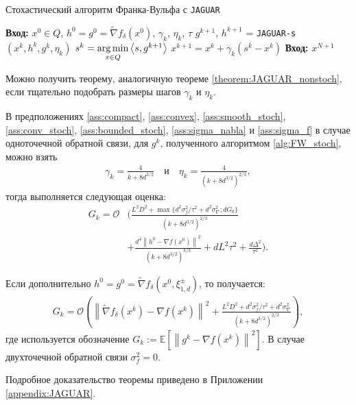     \begin{algorithm}[H]
        \caption{Стохастический алгоритм Франка-Вульфа с \texttt{JAGUAR}} \label{alg:FW_stoch}
        \begin{algorithmic}[1]
        	\State \textbf{Вход:} $x^0 \in Q$, $h^0 = g^0 = \widetilde{\nabla} f_\delta (x^0)$, $\gamma_k$, $\eta_k$, $\tau$
                \State $g^{k + 1}$, $h^{k + 1}$ = \texttt{JAGUAR-s} $\left( x^k, h^k, g^k, \eta_k \right)$
                \State $s^k = \operatorname*{arg\,min}\limits_{x \in Q} \left< s, g^{k + 1} \right>$
                \State $x^{k + 1} = x^k + \gamma_k (s^k - x^k)$
            \EndFor
            \State \textbf{Вход:} $x^{N + 1}$
        \end{algorithmic}
    \end{algorithm}

    Можно получить теорему, аналогичную теореме \ref{theorem:JAGUAR_nonstoch}, если тщательно подобрать размеры шагов $\gamma_k$ и $\eta_k$. 
    
    \begin{theorem} \label{theorem:JAGUAR}
    
        В предположениях \ref{ass:compact}, \ref{ass:convex}, \ref{ass:smooth_stoch}, \ref{ass:conv_stoch}, \ref{ass:bounded_stoch}, \ref{ass:sigma_nabla} и \ref{ass:sigma_f} в случае одноточечной обратной связи, для $g^k$, полученного алгоритмом \ref{alg:FW_stoch}, можно взять
        \begin{align*}
            \gamma_k = \frac{4}{k + 8d^{3/2}} \quad \text{и} \quad \eta_k = \frac{4}{(k + 8d^{3/2})^{2/3}},
        \end{align*}
        тогда выполняется следующая оценка:
        \begin{align*}
            G_k = \mathcal{O}
            &\Bigg(
            \frac{L^2 D^2 + \max \{ d^2 \sigma_f^2 / \tau^2 + d^2 \sigma_\nabla^2; d G_0\}}{(k + 8d^{3 / 2})^{2 / 3}}\\
            &+
            \frac{d^4 \left\| h^0 - \nabla f(x^0) \right\|^2}{(k + 8d^{3 / 2})^{8 / 3}} + d L^2 \tau^2 + \frac{d \Delta^2}{\tau^2} \Bigg).
        \end{align*}

        \noindent Если дополнительно $h^0 = g^0 = \widetilde{\nabla} f_\delta (x^0, \xi_{\overline{1, d}}^\pm)$, то получается:
        \begin{align*}
            G_k = \mathcal{O} \left( \left\| \widetilde{\nabla} f_\delta (x^k) - \nabla f(x^k) \right\|^2 + \frac{L^2 D^2 + d^2 \sigma_f^2 / \tau^2 + d^2 \sigma_\nabla^2}{(k + 8d^{3 / 2})^{2 / 3}} \right),
        \end{align*}
        где используется обозначение $G_k := \mathbb{E} \left[ \left\| g^k - \nabla f(x^k) \right\|^2 \right]$. В случае двухточечной обратной связи $\sigma^2_f = 0$.

        \noindent Подробное доказательство теоремы приведено в Приложении \ref{appendix:JAGUAR}.
        
    \end{theorem}
    
